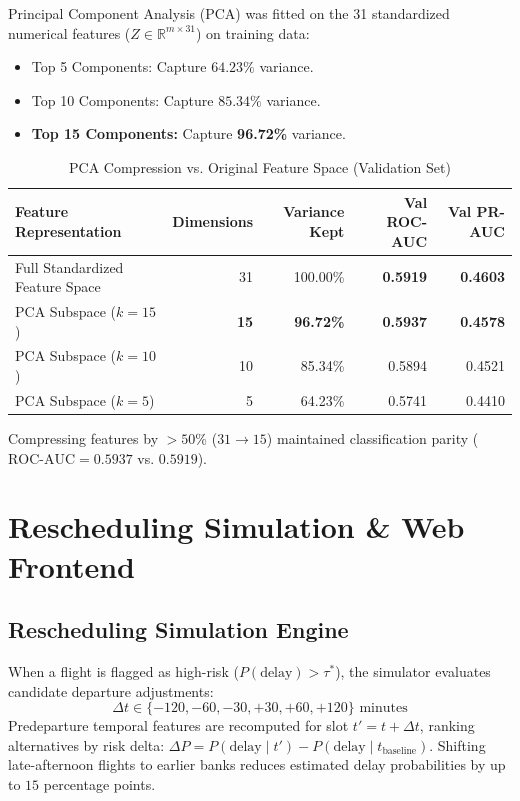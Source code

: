 \documentclass[11pt,a4paper]{article}
\begin{document}
Principal Component Analysis (PCA) was fitted on the 31 standardized numerical features ($Z \in \mathbb{R}^{m \times 31}$) on training data:
\begin{itemize}[noitemsep]
    \item Top 5 Components: Capture $64.23\%$ variance.
    \item Top 10 Components: Capture $85.34\%$ variance.
    \item \textbf{Top 15 Components:} Capture \textbf{96.72\%} variance.
\end{itemize}

\begin{table}[H]
\centering
\small
\caption{PCA Compression vs. Original Feature Space (Validation Set)}
\label{tab:pca}
\begin{tabular}{lrrrr}
\toprule
\textbf{Feature Representation} & \textbf{Dimensions} & \textbf{Variance Kept} & \textbf{Val ROC-AUC} & \textbf{Val PR-AUC} \\
\midrule
Full Standardized Feature Space & 31 & 100.00\% & \textbf{0.5919} & \textbf{0.4603} \\
PCA Subspace ($k = 15$) & \textbf{15} & \textbf{96.72\%} & \textbf{0.5937} & \textbf{0.4578} \\
PCA Subspace ($k = 10$) & 10 & 85.34\% & 0.5894 & 0.4521 \\
PCA Subspace ($k = 5$) & 5 & 64.23\% & 0.5741 & 0.4410 \\
\bottomrule
\end{tabular}
\end{table}
Compressing features by $>50\%$ ($31 \rightarrow 15$) maintained classification parity ($\text{ROC-AUC} = 0.5937$ vs. $0.5919$).

\section{Rescheduling Simulation \& Web Frontend}

\subsection{Rescheduling Simulation Engine}
When a flight is flagged as high-risk ($P(\text{delay}) > \tau^*$), the simulator evaluates candidate departure adjustments:
\begin{equation}
    \Delta t \in \{-120, -60, -30, +30, +60, +120\} \text{ minutes}
\end{equation}
Predeparture temporal features are recomputed for slot $t' = t + \Delta t$, ranking alternatives by risk delta: $\Delta P = P(\text{delay} \mid t') - P(\text{delay} \mid t_{\text{baseline}})$. Shifting late-afternoon flights to earlier banks reduces estimated delay probabilities by up to $15$ percentage points.
\end{document}
